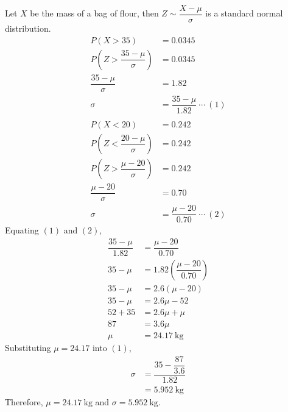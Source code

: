 \documentclass{report}
\begin{document}
\begin{enumerate}[leftmargin=*]
\begin{enumerate}
                    Let $X$ be the mass of a bag of flour, then $Z \sim \dfrac{X - \mu}{\sigma}$ is
                    a standard normal distribution.
                    \begin{align*}
                        P(X > 35)                                  & = 0.0345                               \\
                        P\left(Z > \dfrac{35 - \mu}{\sigma}\right) & = 0.0345                               \\
                        \dfrac{35 - \mu}{\sigma}                   & = 1.82                                 \\
                        \sigma                                     & = \dfrac{35 - \mu}{1.82}\ \cdots\ (1)  \\
                        \\
                        P(X < 20)                                  & = 0.242                                \\
                        P\left(Z < \dfrac{20 - \mu}{\sigma}\right) & = 0.242                                \\
                        P\left(Z > \dfrac{\mu - 20}{\sigma}\right) & = 0.242                                \\
                        \dfrac{\mu - 20}{\sigma}                   & = 0.70                                 \\
                        \sigma                                     & = \dfrac{\mu - 20}{0.70} \ \cdots\ (2)
                    \end{align*}
                    Equating $(1)$ and $(2)$,
                    \begin{align*}
                        \dfrac{35 - \mu}{1.82} & = \dfrac{\mu - 20}{0.70}                  \\
                        35 - \mu               & = 1.82\left(\dfrac{\mu - 20}{0.70}\right) \\
                        35 - \mu               & = 2.6(\mu - 20)                           \\
                        35 - \mu               & = 2.6\mu - 52                             \\
                        52 + 35                & = 2.6\mu + \mu                            \\
                        87                     & = 3.6\mu                                  \\
                        \mu                    & = 24.17\mathrm{~kg}
                    \end{align*}
                    Substituting $\mu = 24.17$ into $(1)$,
                    \begin{align*}
                        \sigma & = \dfrac{35 - \dfrac{87}{3.6}}{1.82} \\
                               & = 5.952\mathrm{~kg}
                    \end{align*}
                    Therefore, $\mu = 24.17\mathrm{~kg}$ and $\sigma = 5.952\mathrm{~kg}$.
          \end{enumerate}
\end{enumerate}
\end{document}
